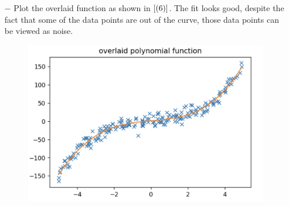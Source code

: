 \documentclass[11pt]{article}
\begin{document}
\begin{itemize}
\begin{itemize}
 \item[$-$] Plot the overlaid function as shown in $\ref{(6)}$. The fit looks good, despite the fact that some of the data points are out of the curve, those data points can be viewed as noise.
 \begin{figure}[htbp]
\centering
\includegraphics[width = .75\textwidth]{6.png}
\caption{}
\label{(6)}
\end{figure}
\end{itemize}
\end{itemize}
\end{document}
